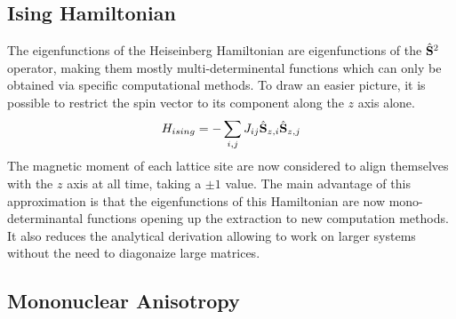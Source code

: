 \documentclass[10pt]{report}
\numberwithin{equation}{section}
\begin{document}
\subsection*{Ising Hamiltonian}

The eigenfunctions of the Heiseinberg Hamiltonian are eigenfunctions of the $\hat{\vb S}^2$ operator, making them mostly multi-determinental functions which can only be obtained via specific computational methods.
To draw an easier picture, it is possible to restrict the spin vector to its component along the $z$ axis alone.
\begin{equation}
    H_{ising}=- \sum_{i,j} J_{ij} \hat{\vb S}_{z,i} \hat{\vb S}_{z,j}
\end{equation}
The magnetic moment of each lattice site are now considered to align themselves with the $z$ axis at all time, taking a $\pm 1$ value.
The main advantage of this approximation is that the eigenfunctions of this Hamiltonian are now mono-determinantal functions opening up the extraction to new computation methods. 
It also reduces the analytical derivation allowing to work on larger systems without the need to diagonaize large matrices.

\subsection{Mononuclear Anisotropy}
\end{document}
